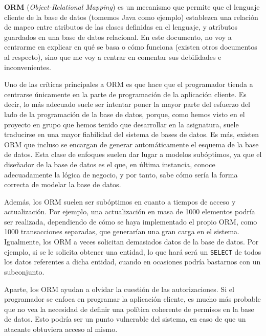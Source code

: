 \documentclass[12pt, a4paper]{article}
\title{\size{15pt}{Problemas de ORM} \vspace{-2ex}}
\date{\vspace{-5ex}}
\begin{document}
\maketitle
\thispagestyle{empty}

\vspace{-10ex}

\textbf{ORM} (\textit{Object-Relational Mapping}) es un mecanismo que permite que el lenguaje cliente de la base de datos (tomemos Java como ejemplo) establezca una relación de mapeo entre atributos de las clases definidas en el lenguaje, y atributos guardados en una base de datos relacional. En este documento, no voy a centrarme en explicar en qué se basa o cómo funciona (existen otros documentos al respecto), sino que me voy a centrar en comentar sus debilidades e inconvenientes.

Uno de las críticas principales a ORM es que hace que el programador tienda a centrarse únicamente en la parte de programación de la aplicación cliente. Es decir, lo más adecuado suele ser intentar poner la mayor parte del esfuerzo del lado de la programación de la base de datos, porque, como hemos visto en el proyecto en grupo que hemos tenido que desarrollar en la asignatura, suele traducirse en una mayor fiabilidad del sistema de bases de datos. Es más, existen ORM que incluso se encargan de generar automáticamente el esquema de la base de datos. Esta clase de enfoques suelen dar lugar a modelos subóptimos, ya que el diseñador de la base de datos es el que, en última instancia, conoce adecuadamente la lógica de negocio, y por tanto, sabe cómo sería la forma correcta de modelar la base de datos.

Además, los ORM suelen ser subóptimos en cuanto a tiempos de acceso y actualización. Por ejemplo, una actualización en masa de 1000 elementos podría ser realizada, dependiendo de cómo se haya implementado el propio ORM, como 1000 transacciones separadas, que generarían una gran carga en el sistema. Igualmente, los ORM a veces solicitan demasiados datos de la base de datos. Por ejemplo, si se le solicita obtener una entidad, lo que hará será un \texttt{SELECT} de todos los datos referentes a dicha entidad, cuando en ocasiones podría bastarnos con un subconjunto.

Aparte, los ORM ayudan a olvidar la cuestión de las autorizaciones. Si el programador se enfoca en programar la aplicación cliente, es mucho más probable que no vea la necesidad de definir una política coherente de permisos en la base de datos. Esto podría ser un punto vulnerable del sistema, en caso de que un atacante obtuviera acceso al mismo.
\end{document}
